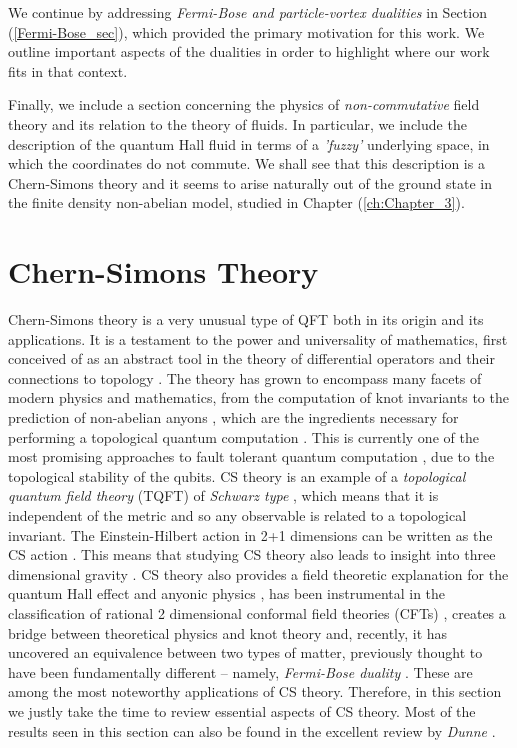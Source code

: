     We continue by addressing \textit{Fermi-Bose and particle-vortex dualities} in Section (\ref{Fermi-Bose_sec}), which provided the primary motivation for this work. We outline important aspects of the dualities in order to highlight where our work fits in that context.

    Finally, we include a section concerning the physics of \textit{non-commutative} field theory and its relation to the theory of fluids. In particular, we include the description of the quantum Hall fluid in terms of a \textit{'fuzzy'} underlying space, in which the coordinates do not commute. We shall see that this description is a Chern-Simons theory and it seems to arise naturally out of the ground state in the finite density non-abelian model, studied in Chapter (\ref{ch:Chapter_3}).

        \section{Chern-Simons Theory} \label{CS_sec}
    Chern-Simons theory is a very unusual type of QFT both in its origin and its applications. It is a testament to the power and universality of mathematics, first conceived of as an abstract tool in the theory of differential operators and their connections to topology \cite{Chern:1974ft}. The theory has grown to encompass many facets of modern physics and mathematics, from the computation of knot invariants \cite{Witten:1988hf} to the prediction of non-abelian anyons \cite{Moore:1991ks}, which are the ingredients necessary for performing a topological quantum computation \cite{RevModPhys.80.1083}. This is currently one of the most promising approaches to fault tolerant quantum computation \cite{Kitaev:1997wr}, due to the topological stability of the qubits. CS theory is an example of a \textit{topological quantum field theory} (TQFT) of \textit{Schwarz type} \cite{Schwarz:2000ct}, which means that it is independent of the metric and so any observable is related to a topological invariant. The Einstein-Hilbert action in 2+1 dimensions can be written as the CS action \cite{Achucarro:1987vz}. This means that studying CS theory also leads to insight into three dimensional gravity \cite{Carlip:2005zn, Deser:1982vy, Witten:2007kt}. CS theory also provides a field theoretic explanation for the quantum Hall effect and anyonic physics \cite{Zee, Tong:2016kpv}, has been instrumental in the classification of rational 2 dimensional conformal field theories (CFTs) \cite{Moore:1989yh}, creates a bridge between theoretical physics and knot theory \cite{Witten:1988hf} and, recently, it has uncovered an equivalence between two types of matter, previously thought to have been fundamentally different -- namely, \textit{Fermi-Bose duality} \cite{Aharony:2015mjs, Aharony:2012nh, Giombi:2011kc, Aharony:2011jz, Giveon:2008zn}. These are among the most noteworthy applications of CS theory. Therefore, in this section we justly take the time to review essential aspects of CS theory. Most of the results seen in this section can also be found in the excellent review by \textit{Dunne} \cite{Dunne:1998qy}.

